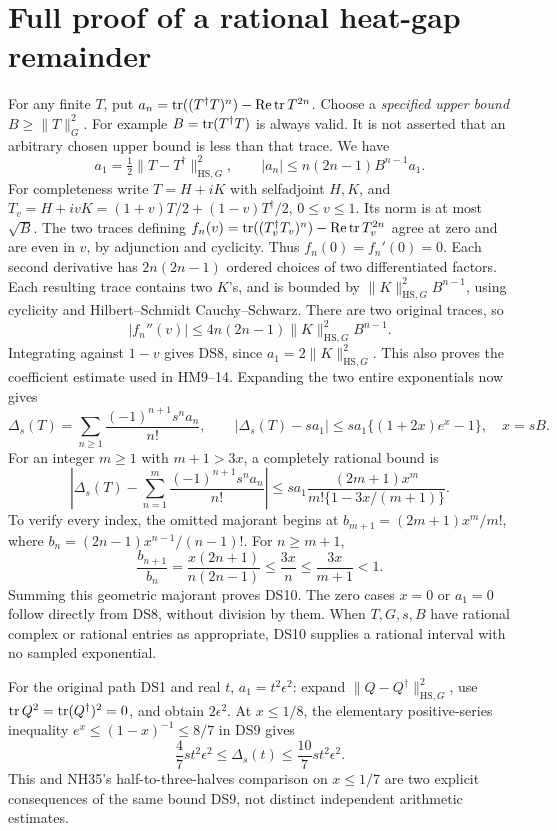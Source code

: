 \documentclass[11pt]{article}
\begin{document}
\section{Full proof of a rational heat-gap remainder}
For any finite \(T\), put \(a_n=\operatorname{tr}((T^\dagger T)^n)-\operatorname{Re}\operatorname{tr} T^{2n}\).
Choose a \emph{specified upper bound} \(B\ge\|T\|_G^2\).
For example \(B=\operatorname{tr}(T^\dagger T)\) is always valid. It is not asserted
that an arbitrary chosen upper bound is less than that trace.
We have
\[
 a_1=\tfrac12\|T-T^\dagger\|_{\mathrm{HS},G}^2,\qquad
 |a_n|\le n(2n-1)B^{n-1}a_1 .
 \tag{DS8}
\]
For completeness write \(T=H+iK\) with selfadjoint \(H,K\), and
\(T_v=H+ivK=(1+v)T/2+(1-v)T^\dagger/2\), \(0\le v\le1\).
Its norm is at most \(\sqrt B\).
The two traces defining
\(f_n(v)=\operatorname{tr}((T_v^\dagger T_v)^n)-\operatorname{Re}\operatorname{tr} T_v^{2n}\)
agree at zero and are even in \(v\), by adjunction and cyclicity.
Thus \(f_n(0)=f_n'(0)=0\).
Each second derivative has \(2n(2n-1)\) ordered choices of two
differentiated factors. Each resulting trace contains two \(K\)'s,
and is bounded by
\(\|K\|_{\mathrm{HS},G}^2B^{n-1}\), using cyclicity and
Hilbert--Schmidt Cauchy--Schwarz. There are two original traces, so
\[
 |f_n''(v)|\le4n(2n-1)\|K\|_{\mathrm{HS},G}^2 B^{n-1}.
\]
Integrating against \(1-v\) gives DS8, since
\(a_1=2\|K\|_{\mathrm{HS},G}^2\).
This also proves the coefficient estimate used in HM9--14.
Expanding the two entire exponentials now gives
\[
 \Delta_s(T)=\sum_{n\ge1}\frac{(-1)^{n+1}s^na_n}{n!},
 \qquad
 |\Delta_s(T)-sa_1|\le sa_1\{(1+2x)e^x-1\},\quad x=sB.
 \tag{DS9}
\]
For an integer \(m\ge1\) with \(m+1>3x\), a completely rational bound is
\[
 \left|\Delta_s(T)-\sum_{n=1}^m
             \frac{(-1)^{n+1}s^na_n}{n!}\right|
 \le sa_1\frac{(2m+1)x^m}{m!\{1-3x/(m+1)\}} .
 \tag{DS10}
\]
To verify every index, the omitted majorant begins at
\(b_{m+1}=(2m+1)x^m/m!\), where
\(b_n=(2n-1)x^{n-1}/(n-1)!\).
For \(n\ge m+1\),
\[
 \frac{b_{n+1}}{b_n}
 =\frac{x(2n+1)}{n(2n-1)}
 \le\frac{3x}{n}\le\frac{3x}{m+1}<1.
\]
Summing this geometric majorant proves DS10. The zero cases \(x=0\)
or \(a_1=0\) follow directly from DS8, without division by them.
When \(T,G,s,B\) have rational complex or rational entries as appropriate,
DS10 supplies a rational interval with no sampled exponential.

For the original path DS1 and real \(t\), \(a_1=t^2\epsilon^2\):
expand \(\|Q-Q^\dagger\|_{\mathrm{HS},G}^2\), use
\(\operatorname{tr} Q^2=\operatorname{tr}(Q^\dagger)^2=0\), and obtain \(2\epsilon^2\).
At \(x\le1/8\), the elementary positive-series inequality
\(e^x\le(1-x)^{-1}\le8/7\) in DS9 gives
\[
 \frac47 st^2\epsilon^2\le\Delta_s(t)
 \le\frac{10}{7}st^2\epsilon^2 .
 \tag{DS11}
\]
This and NH35's half-to-three-halves comparison on \(x\le1/7\)
are two explicit consequences of the same bound DS9, not distinct
independent arithmetic estimates.
\end{document}
